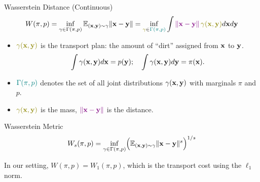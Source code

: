 \documentclass{beamer}
\begin{document}
\begin{frame}{Wasserstein Distance (Continuous)}
	\vspace{-0.7cm}
	\[
	W(\pi, p) = \inf_{\gamma \in \Gamma(\pi, p)} \bbE_{(\bx, \by) \sim \gamma} \| \bx - \by \| =  \inf_{{\color{olive}\gamma} \in {\color{teal}\Gamma(\pi, p)}} \int {\color{violet} \| \bx - \by \|}\, {\color{olive}\gamma (\bx, \by)} d \bx d \by
	\]
	\vspace{-0.4cm}
	\begin{itemize}
		\item ${\color{olive}\gamma (\bx, \by)}$ is the transport plan: the amount of “dirt” assigned from $\mathbf{x}$ to $\mathbf{y}$.
		\vspace{-0.2cm}
		\[
		\int \gamma(\mathbf{x}, \mathbf{y}) d \mathbf{x} = p(\mathbf{y}); \quad \int \gamma(\mathbf{x}, \mathbf{y}) d \mathbf{y} = \pi(\mathbf{x}).
		\]
		\vspace{-0.6cm}
		\item ${\color{teal}\Gamma(\pi, p)}$ denotes the set of all joint distributions $\gamma (\mathbf{x}, \mathbf{y})$ with marginals $\pi$ and $p$.
		\item ${\color{olive}\gamma(\bx, \by)}$ is the mass, ${\color{violet}\|\mathbf{x}-\mathbf{y}\|}$ is the distance.
	\end{itemize}
	\begin{block}{Wasserstein Metric}
		\vspace{-0.2cm}
		\[
		W_s(\pi, p) = \inf_{\gamma \in \Gamma(\pi, p)} \Bigl(\mathbb{E}_{(\mathbf{x}, \mathbf{y}) \sim \gamma} \|\mathbf{x}-\mathbf{y}\|^s\Bigr)^{1/s}
		\]
		\vspace{-0.4cm}
	\end{block}
	In our setting, $W(\pi, p) = W_1(\pi, p)$, which is the transport cost using the $\ell_1$ norm.
\end{frame}
\end{document}
